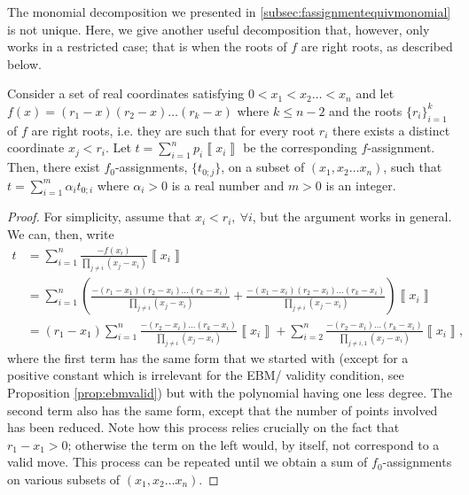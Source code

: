 \documentclass{article}
\begin{document}
The monomial decomposition we presented in \cref{subsec:fassignmentequivmonomial} is not unique. Here, we give another useful
decomposition that, however, only works in a restricted case; that is when the roots of $f$ are right roots, as described below.
\begin{lemma}
	Consider a set of real coordinates satisfying $0<x_{1}<x_{2}\dots<x_{n}$
	and let $f(x)=(r_{1}-x)(r_{2}-x)\dots(r_{k}-x)$ where $k\le n-2$
	and the roots $\{r_{i}\}_{i=1}^{k}$ of $f$ are right roots, i.e.
	they are such that for every root $r_{i}$ there exists a distinct
	coordinate $x_{j}<r_{i}$. Let $t=\sum_{i=1}^{n}p_{i}\left\llbracket x_{i}\right\rrbracket $
	be the corresponding $f$-assignment. Then, there exist $f_{0}$-assignments, $\{t_{0;j}\}$,
	on a subset of $(x_{1},x_{2}\dots x_{n})$, such that $t=\sum_{i=1}^{m}\alpha_{i}t_{0;i}$
	where $\alpha_{i}>0$ is a real number and $m>0$ is an integer. \label{lem:rightRoots}
\end{lemma}

\begin{proof}
	For simplicity, assume that $x_{i}<r_{i}, \ \forall i$, but the
	argument works in general. We can, then, write
	\begin{align*}
	t & =\sum_{i=1}^{n}\frac{-f(x_{i})}{\prod_{j\neq i}(x_{j}-x_{i})}\left\llbracket x_{i}\right\rrbracket \\
	& =\sum_{i=1}^{n}\left(\frac{-(r_{1}-x_{1})(r_{2}-x_{i})\dots(r_{k}-x_{i})}{\prod_{j\neq i}(x_{j}-x_{i})}+\frac{-(x_{1}-x_{i})(r_{2}-x_{i})\dots(r_{k}-x_{i})}{\prod_{j\neq i}(x_{j}-x_{i})}\right)\left\llbracket x_{i}\right\rrbracket \\
	& =(r_{1}-x_{1})\sum_{i=1}^{n}\frac{-(r_{2}-x_{i})\dots(r_{k}-x_{i})}{\prod_{j\neq i}(x_{j}-x_{i})}\left\llbracket x_{i}\right\rrbracket +\sum_{i=2}^{n}\frac{-(r_{2}-x_{i})\dots(r_{k}-x_{i})}{\prod_{j\neq i,1}(x_{j}-x_{i})}\left\llbracket x_{i}\right\rrbracket ,
	\end{align*}
	where the first term has the same form that we started with (except
	for a positive constant which is irrelevant for the EBM/ validity condition, see Proposition \ref{prop:ebmvalid}) but with the polynomial having one less
	degree. The second term also has the same form, except that the number
	of points involved has been reduced. Note how this process relies
	crucially on the fact that $r_{1}-x_{1}>0$; otherwise the term
	on the left would, by itself, not correspond to a valid move. This
	process can be repeated until we obtain a sum of $f_{0}$-assignments
	on various subsets of $(x_{1},x_{2}\dots x_{n})$.
\end{proof}
\end{document}
